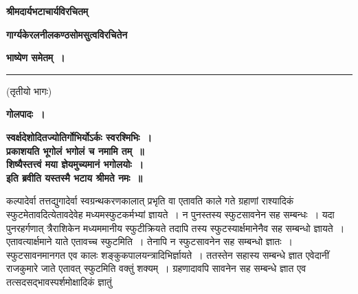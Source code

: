 \documentclass[11pt, openany]{book}
\makeatletter
\newcommand{\devanagarinumeral}[1]{%
	\devanagaridigits{\number\csname c@#1\endcsname}}
\makeatother
\begin{document}
\newpage
\begin{center}
\textbf{\vspace{2cm}{॥ श्रीः ॥}}

\textbf{\large श्रीमदार्यभटाचार्यविरचितम्}


\vspace{0.2cm}\textbf{\large गार्ग्यकेरलनीलकण्ठसोमसुत्वविरचितेन}

\vspace{0.2cm}\textbf{\large भाष्येण समेतम्~।}

\rule{3cm}{.3mm} 

\vspace{0.4cm}
(तृतीयो भागः)

\vspace{0.2cm}
\large \textbf{गोलपादः~।}\\
\vspace{0.4cm}

\textbf{स्वर्क्षदेशोदितज्योतिर्गोभिर्योऽर्कः स्वरश्मिभिः~। \\
प्रकाशयति भूगोलं भगोलं च नमामि तम्~॥\\
शिष्यैस्तत्त्वं मया ज्ञेयमुच्यमानं भगोलयोः~। \\
इति ब्रवीति यस्तस्मै भटाय श्रीमते नमः~॥} \\
\end{center}

कल्पादेर्वा तत्तद्युगादेर्वा स्वग्रन्थकरणकालात् प्रभृति वा एतावति काले गते ग्रहाणां राश्यादिकं स्फुटमेतावदित्येतावदेवेह
मध्यमस्फुटकर्मभ्यां ज्ञायते~। न पुनस्तस्य स्फुटसावनेन सह सम्बन्धः~। यदा पुनरहर्गणात् त्रैराशिकेन मध्यममानीय स्फुटीक्रियते तदापि तस्य 
स्फुटस्यार्क्षमानेनैव सह सम्बन्धो ज्ञायते~। एतावत्यार्क्षमाने याते एतावच्च स्फुटमिति~। तेनापि न स्फुटसावनेन सह सम्बन्धो ज्ञातः~। स्फुटसावनमानगत एव कालः शङ्कुकपालयन्त्रादिभिर्ज्ञायते~। ततस्तेन सहास्य सम्बन्धे ज्ञात एवेदानीं राजकुमारे जाते एतावत् स्फुटमिति वक्तुं शक्यम्~। ग्रहणादावपि सावनेन सह सम्बन्धे ज्ञात एव तत्सदसद्भावस्पर्शमोक्षादिकं ज्ञातुं\\

\afterpage{\fancyhead[LE,RO]{\thepage}}
\cfoot{}

\newpage
\renewcommand{\thepage}{\devanagarinumeral{page}}
\setcounter{page}{2}
\end{document}

